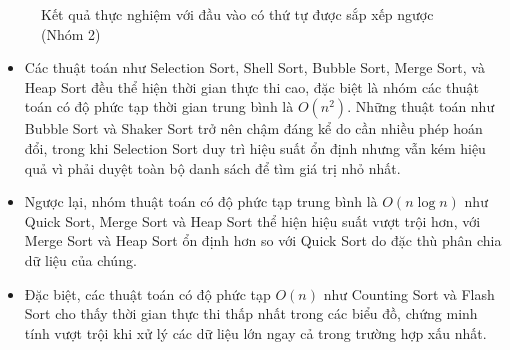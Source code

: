\begin{figure}[H]
\caption{Kết quả thực nghiệm với đầu vào có thứ tự được sắp xếp ngược (Nhóm 2)}
\end{figure}

\begin{itemize}[label=$\circ$]
    \item Các thuật toán như Selection Sort, Shell Sort, Bubble Sort, 
    Merge Sort, và Heap Sort đều thể hiện thời gian thực thi cao, đặc 
    biệt là nhóm các thuật toán có độ phức tạp thời gian trung bình là 
    $O\left(n^2\right)$. Những thuật toán như Bubble Sort và Shaker Sort 
    trở nên chậm đáng kể do cần nhiều phép hoán đổi, trong khi Selection 
    Sort duy trì hiệu suất ổn định nhưng vẫn kém hiệu quả vì phải duyệt 
    toàn bộ danh sách để tìm giá trị nhỏ nhất.
    \item Ngược lại, nhóm thuật toán có độ phức tạp trung bình là 
    $O\left(n\log{n}\right)$ như Quick Sort, Merge Sort và Heap Sort thể 
    hiện hiệu suất vượt trội hơn, với Merge Sort và Heap Sort ổn định hơn 
    so với Quick Sort do đặc thù phân chia dữ liệu của chúng.
    \item Đặc biệt, các thuật toán có độ phức tạp $O\left(n\right)$ như 
    Counting Sort và Flash Sort cho thấy thời gian thực thi thấp nhất 
    trong các biểu đồ, chứng minh tính vượt trội khi xử lý các dữ liệu 
    lớn ngay cả trong trường hợp xấu nhất.
\end{itemize}

